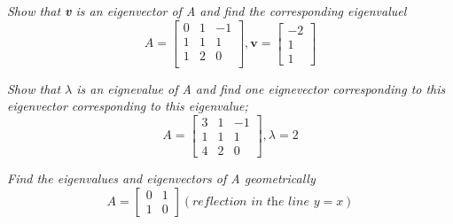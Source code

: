 \documentclass[12pt,letterpaper]{hmcpset}
\begin{document}


\begin{problem}[4.1.6]

\textit{Show that \textbf{v} is an eigenvector of A and find the corresponding eigenvaluel }
$$
A=\begin{bmatrix}
0&1&-1\\
1&1&1\\
1&2&0\\
\end{bmatrix}
, \textbf{v}= \begin{bmatrix}
-2\\1\\1
\end{bmatrix}
$$
\end{problem}
\begin{solution}
\end{solution}

\newpage




\begin{problem}[4.1.12]
\textit{Show that $\lambda$ is an eignevalue of A and find one eignevector corresponding to this eigenvector corresponding to this eigenvalue;}
$$
A=\begin{bmatrix}
3&1&-1\\
1&1&1\\
4&2&0
\end{bmatrix}
, \lambda=2
$$
\end{problem}

\begin{solution}
\end{solution}

\newpage



\begin{problem}[4.1.14]
\textit{Find the eigenvalues and eigenvectors of A geometrically} 
$$ A=\begin{bmatrix}
0&1\\1&0
\end{bmatrix} (\textit{reflection in the line } y=x)
$$
\end{problem}

\begin{solution}
\end{solution}

\newpage
\end{document}
